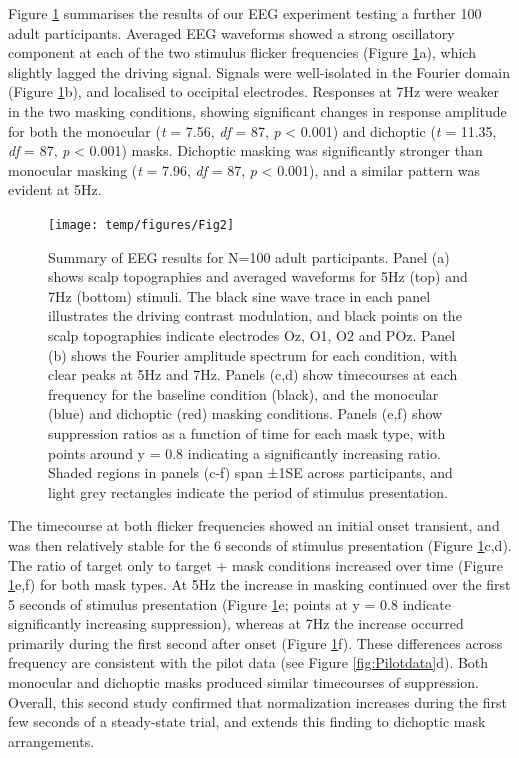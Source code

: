 \documentclass[
]{article}
\begin{document}
Figure \ref{fig:EEGdata} summarises the results of our EEG experiment testing a further 100 adult participants. Averaged EEG waveforms showed a strong oscillatory component at each of the two stimulus flicker frequencies (Figure \ref{fig:EEGdata}a), which slightly lagged the driving signal. Signals were well-isolated in the Fourier domain (Figure \ref{fig:EEGdata}b), and localised to occipital electrodes. Responses at 7Hz were weaker in the two masking conditions, showing significant changes in response amplitude for both the monocular (\emph{t} = 7.56, \emph{df} = 87, \emph{p} \textless{} 0.001) and dichoptic (\emph{t} = 11.35, \emph{df} = 87, \emph{p} \textless{} 0.001) masks. Dichoptic masking was significantly stronger than monocular masking (\emph{t} = 7.96, \emph{df} = 87, \emph{p} \textless{} 0.001), and a similar pattern was evident at 5Hz.

\begin{figure}

{\centering \texttt{[image: temp/figures/Fig2]} 

}

\caption{Summary of EEG results for N=100 adult participants. Panel (a) shows scalp topographies and averaged waveforms for 5Hz (top) and 7Hz (bottom) stimuli. The black sine wave trace in each panel illustrates the driving contrast modulation, and black points on the scalp topographies indicate electrodes Oz, O1, O2 and POz. Panel (b) shows the Fourier amplitude spectrum for each condition, with clear peaks at 5Hz and 7Hz. Panels (c,d) show timecourses at each frequency for the baseline condition (black), and the monocular (blue) and dichoptic (red) masking conditions. Panels (e,f) show suppression ratios as a function of time for each mask type, with points around y = 0.8 indicating a significantly increasing ratio. Shaded regions in panels (c-f) span ±1SE across participants, and light grey rectangles indicate the period of stimulus presentation.}\label{fig:EEGdata}
\end{figure}

The timecourse at both flicker frequencies showed an initial onset transient, and was then relatively stable for the 6 seconds of stimulus presentation (Figure \ref{fig:EEGdata}c,d). The ratio of target only to target + mask conditions increased over time (Figure \ref{fig:EEGdata}e,f) for both mask types. At 5Hz the increase in masking continued over the first 5 seconds of stimulus presentation (Figure \ref{fig:EEGdata}e; points at y = 0.8 indicate significantly increasing suppression), whereas at 7Hz the increase occurred primarily during the first second after onset (Figure \ref{fig:EEGdata}f). These differences across frequency are consistent with the pilot data (see Figure \ref{fig:Pilotdata}d). Both monocular and dichoptic masks produced similar timecourses of suppression. Overall, this second study confirmed that normalization increases during the first few seconds of a steady-state trial, and extends this finding to dichoptic mask arrangements.
\end{document}
